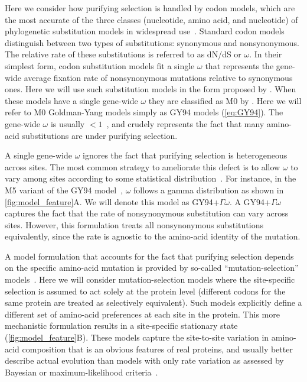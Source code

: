 \documentclass[11pt]{article}
\begin{document}
Here we consider how purifying selection is handled by codon models, which are the most accurate of the three classes (nucleotide, amino acid, and nucleotide) of phylogenetic substitution models in widespread use~\citep{arenas2015trends}.
Standard codon models distinguish between two types of substitutions: synonymous and nonsynonymous.
The relative rate of these substitutions is referred to as dN/dS or $\omega$.
In their simplest form, codon substitution models fit a single $\omega$ that represents the gene-wide average fixation rate of nonsynonymous mutations relative to synonymous ones.
Here we will use such substitution models in the form proposed by \citet{goldman1994codon}.
When these models have a single gene-wide $\omega$ they are classified as M0 by \citet{yang2000codon}.
Here we will refer to M0 Goldman-Yang models simply as GY94 models (\ref{eq:GY94}). 
The gene-wide $\omega$ is usually $<1$~\citep{murrell2015gene}, and crudely represents the fact that many amino-acid substitutions are under purifying selection.

A single gene-wide $\omega$ ignores the fact that purifying selection is heterogeneous across sites.
The most common strategy to ameliorate this defect is to allow $\omega$ to vary among sites according to some statistical distribution~\citep{yang1994maximum,yang2000codon}.
For instance, in the M5 variant of the GY94 model~\citep{yang2000codon}, $\omega$ follows a gamma distribution as shown in \ref{fig:model_feature}A.
We will denote this model as GY94+$\Gamma\omega$.
A GY94+$\Gamma\omega$ captures the fact that the rate of nonsynonymous substitution can vary across sites. 
However, this formulation treats all nonsynonymous substitutions equivalently, since the rate is agnostic to the amino-acid identity of the mutation. 

A model formulation that accounts for the fact that purifying selection depends on the specific amino-acid mutation is provided by so-called ``mutation-selection'' models~\citep{halpern1998evolutionary,yang2008mutation,rodrigue2010mutation,tamuri2012estimating,mccandlish2014modeling}.
Here we will consider mutation-selection models where the site-specific selection is assumed to act solely at the protein level (different codons for the same protein are treated as selectively equivalent).
Such models explicitly define a different set of amino-acid preferences at each site in the protein. 
This more mechanistic formulation results in a site-specific stationary state (\ref{fig:model_feature}B). 
These models capture the site-to-site variation in amino-acid composition that is an obvious features of real proteins, and usually better describe actual evolution than models with only rate variation as assessed by Bayesian or maximum-likelihood criteria~\citep{lartillot2004bayesian, le2008phylogenetic, si2008empirical, wang2008class, rodrigue2010mutation,bloom2014experimentally,bloom2014informed,hilton2017phydms}.
\end{document}
